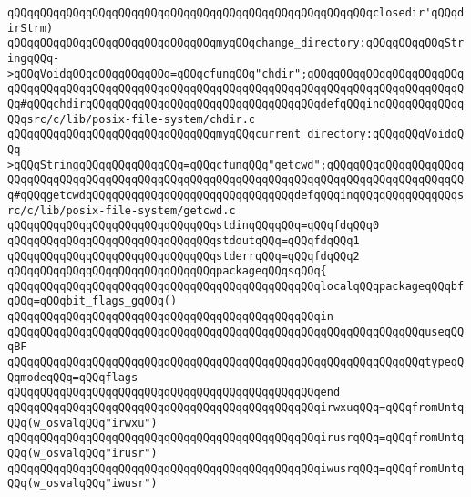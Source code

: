 \verb|qQQqqQQqqQQqqQQqqQQqqQQqqQQqqQQqqQQqqQQqqQQqqQQqqQQqqQQqclosedir'qQQqdirStrm)|\newline
\newline
\verb|qQQqqQQqqQQqqQQqqQQqqQQqqQQqqQQqmyqQQqchange_directory:qQQqqQQqqQQqStringqQQq->qQQqVoidqQQqqQQqqQQqqQQq=qQQqcfunqQQq"chdir";qQQqqQQqqQQqqQQqqQQqqQQqqQQqqQQqqQQqqQQqqQQqqQQqqQQqqQQqqQQqqQQqqQQqqQQqqQQqqQQqqQQqqQQqqQQqqQQq#qQQqchdirqQQqqQQqqQQqqQQqqQQqqQQqqQQqqQQqqQQqdefqQQqinqQQqqQQqqQQqqQQqsrc/c/lib/posix-file-system/chdir.c|\newline
\verb|qQQqqQQqqQQqqQQqqQQqqQQqqQQqqQQqmyqQQqcurrent_directory:qQQqqQQqVoidqQQq->qQQqStringqQQqqQQqqQQqqQQq=qQQqcfunqQQq"getcwd";qQQqqQQqqQQqqQQqqQQqqQQqqQQqqQQqqQQqqQQqqQQqqQQqqQQqqQQqqQQqqQQqqQQqqQQqqQQqqQQqqQQqqQQqqQQq#qQQqgetcwdqQQqqQQqqQQqqQQqqQQqqQQqqQQqqQQqdefqQQqinqQQqqQQqqQQqqQQqsrc/c/lib/posix-file-system/getcwd.c|\newline
\newline
\verb|qQQqqQQqqQQqqQQqqQQqqQQqqQQqqQQqstdinqQQqqQQq=qQQqfdqQQq0|\newline
\verb|qQQqqQQqqQQqqQQqqQQqqQQqqQQqqQQqstdoutqQQq=qQQqfdqQQq1|\newline
\verb|qQQqqQQqqQQqqQQqqQQqqQQqqQQqqQQqstderrqQQq=qQQqfdqQQq2|\newline
\newline
\verb|qQQqqQQqqQQqqQQqqQQqqQQqqQQqqQQqpackageqQQqsqQQq{|\newline
\newline
\verb|qQQqqQQqqQQqqQQqqQQqqQQqqQQqqQQqqQQqqQQqqQQqqQQqlocalqQQqpackageqQQqbfqQQq=qQQqbit_flags_gqQQq()|\newline
\verb|qQQqqQQqqQQqqQQqqQQqqQQqqQQqqQQqqQQqqQQqqQQqqQQqin|\newline
\verb|qQQqqQQqqQQqqQQqqQQqqQQqqQQqqQQqqQQqqQQqqQQqqQQqqQQqqQQqqQQqqQQquseqQQqBF|\newline
\verb|qQQqqQQqqQQqqQQqqQQqqQQqqQQqqQQqqQQqqQQqqQQqqQQqqQQqqQQqqQQqqQQqtypeqQQqmodeqQQq=qQQqflags|\newline
\verb|qQQqqQQqqQQqqQQqqQQqqQQqqQQqqQQqqQQqqQQqqQQqqQQqend|\newline
\newline
\verb|qQQqqQQqqQQqqQQqqQQqqQQqqQQqqQQqqQQqqQQqqQQqqQQqirwxuqQQq=qQQqfromUntqQQq(w_osvalqQQq"irwxu")|\newline
\verb|qQQqqQQqqQQqqQQqqQQqqQQqqQQqqQQqqQQqqQQqqQQqqQQqirusrqQQq=qQQqfromUntqQQq(w_osvalqQQq"irusr")|\newline
\verb|qQQqqQQqqQQqqQQqqQQqqQQqqQQqqQQqqQQqqQQqqQQqqQQqiwusrqQQq=qQQqfromUntqQQq(w_osvalqQQq"iwusr")|\newline
